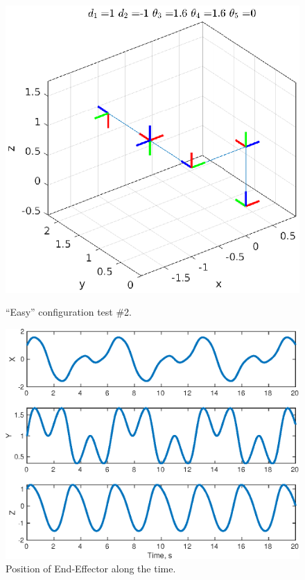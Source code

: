 \documentclass[a4paper,10pt]{article}
\begin{document}
\begin{figure}[H] 
 \centering
 \includegraphics[width=1\linewidth]{configuration2.eps}\label{fig:conf2}
 \caption{``Easy'' configuration test \#2.}
\end{figure}

\begin{figure}[H] 
 \centering
 \includegraphics[width=.7\linewidth]{EndETrajTime.eps}
 \caption{Position of End-Effector along the time.}\label{fig:effecTime}
\end{figure}
\end{document}
